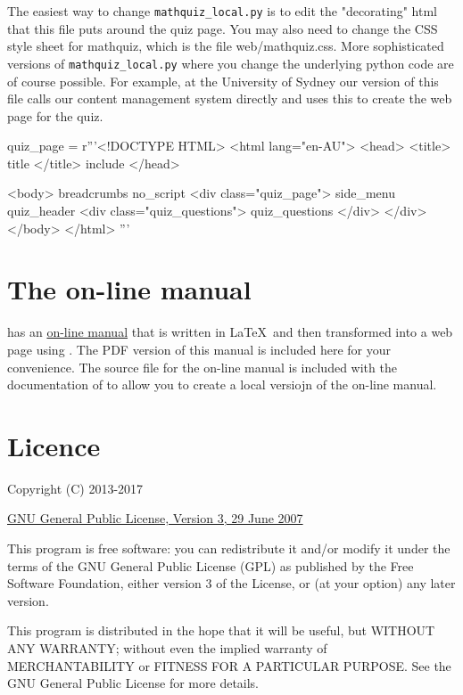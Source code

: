 \documentclass[svgnames]{article}
\begin{document}
  The easiest way to change \verb!mathquiz_local.py! is to edit the
  "decorating" html that this file puts around the quiz page. You may
  also need to change the CSS style sheet for mathquiz, which is the file
  web/mathquiz.css. More sophisticated versions of \verb!mathquiz_local.py!
  where you change the underlying python code are of course possible.
  For example, at the University of Sydney our version of this file
  calls our content management system directly and uses this to create
  the web page for the quiz.

\begin{htmlcode}
    quiz_page = r'''<!DOCTYPE HTML>
    <html lang="en-AU">
    <head>
      <title> {title} </title>
      {include}
    </head>

    <body>
      {breadcrumbs}
      {no_script}
      <div class="quiz_page">
        {side_menu}
        {quiz_header}
        <div class="quiz_questions">
          {quiz_questions}
        </div>
      </div>
    </body>
    </html>
    '''
\end{htmlcode}




\section{The on-line manual}\label{S:online}

  \MathQuiz has an \href{http://www.maths.usyd.edu.au/u/MOW/MathQuiz/doc/mathquiz-manual.html}{on-line manual}
  that is written in \LaTeX\ and then
  transformed into a web page using \MathQuiz. The PDF version of this
  manual is included here for your convenience. The source file for the
  on-line manual is included with the documentation of \MathQuiz to
  allow you to create a local versiojn of the on-line manual.

    

\section{Licence}

Copyright (C) 2013-2017

\href{https://www.gnu.org/licenses/gpl-3.0.en.html}{GNU General Public License, Version 3, 29 June 2007}

This program is free software: you can redistribute it and/or modify it under
the terms of the GNU General Public License (GPL) as published by the Free
Software Foundation, either version 3 of the License, or (at your option) any
later version.

This program is distributed in the hope that it will be useful, but WITHOUT ANY
WARRANTY; without even the implied warranty of MERCHANTABILITY or FITNESS FOR A
PARTICULAR PURPOSE.  See the GNU General Public License for more details.
\end{document}
